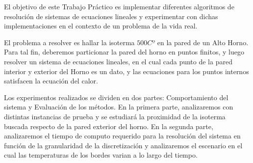 El objetivo de este Trabajo Práctico es implementar diferentes algoritmos de resolución de sistemas de ecuaciones lineales y experimentar con dichas implementaciones en el contexto de un problema de la vida real.

El problema a resolver es hallar la isoterma $500Cº$ en la pared de un Alto Horno. Para tal fin, deberemos particionar la pared del horno en puntos finitos, y luego resolver un sistema de ecuaciones lineales, en el cual cada punto de la pared interior y exterior del Horno es un dato, y las ecuaciones para los puntos internos satisfacen la ecuación del calor.

Los experimentos realizados se dividen en dos partes: Comportamiento del sistema y Evaluación de los métodos. En la primera parte, analizaremos con distintas instancias de prueba y se estudiará la proximidad de la isoterma buscada respecto de la pared exterior del horno. En la segunda parte, analizaremos el tiempo de computo requerido para la resolución del sistema en función de la granularidad de la discretización y analizaremos el escenario en el cual las temperaturas de los bordes varian a lo largo del tiempo.
